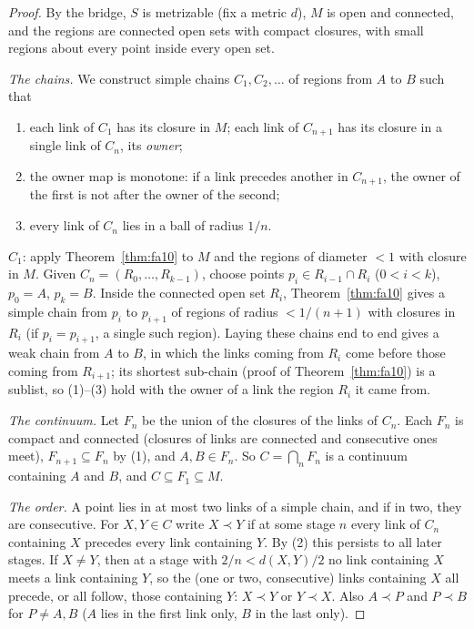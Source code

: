 \begin{proof}
By the bridge, $S$ is metrizable (fix a metric $d$), $M$ is open and connected, and the regions are
connected open sets with compact closures, with small regions about every point inside every open set.

\emph{The chains.} We construct simple chains $C_1,C_2,\dots$ of regions from $A$ to $B$ such that
\begin{enumerate}[label=(\arabic*)]
\item each link of $C_1$ has its closure in $M$; each link of $C_{n+1}$ has its closure in a single link
of $C_n$, its \emph{owner};
\item the owner map is monotone: if a link precedes another in $C_{n+1}$, the owner of the first is not
after the owner of the second;
\item every link of $C_n$ lies in a ball of radius $1/n$.
\end{enumerate}
$C_1$: apply Theorem~\ref{thm:fa10} to $M$ and the regions of diameter $<1$ with closure in $M$. Given
$C_n=(R_0,\dots,R_{k-1})$, choose points $p_i\in R_{i-1}\cap R_i$ ($0<i<k$), $p_0=A$, $p_k=B$. Inside the
connected open set $R_i$, Theorem~\ref{thm:fa10} gives a simple chain from $p_i$ to $p_{i+1}$ of regions of
radius $<1/(n+1)$ with closures in $R_i$ (if $p_i=p_{i+1}$, a single such region). Laying these chains end
to end gives a weak chain from $A$ to $B$, in which the links coming from $R_i$ come before those coming
from $R_{i+1}$; its shortest sub-chain (proof of Theorem~\ref{thm:fa10}) is a sublist, so (1)--(3) hold
with the owner of a link the region $R_i$ it came from.

\emph{The continuum.} Let $F_n$ be the union of the closures of the links of $C_n$. Each $F_n$ is compact
and connected (closures of links are connected and consecutive ones meet), $F_{n+1}\subseteq F_n$ by (1),
and $A,B\in F_n$. So $C=\bigcap_nF_n$ is a continuum containing $A$ and $B$, and $C\subseteq F_1\subseteq M$.

\emph{The order.} A point lies in at most two links of a simple chain, and if in two, they are
consecutive. For $X,Y\in C$ write $X\prec Y$ if at some stage $n$ every link of $C_n$ containing $X$
precedes every link containing $Y$. By (2) this persists to all later stages. If $X\ne Y$, then at a stage
with $2/n<d(X,Y)/2$ no link containing $X$ meets a link containing $Y$, so the (one or two, consecutive)
links containing $X$ all precede, or all follow, those containing $Y$: $X\prec Y$ or $Y\prec X$. Also $A\prec
P$ and $P\prec B$ for $P\ne A,B$ ($A$ lies in the first link only, $B$ in the last only).


\end{proof}
